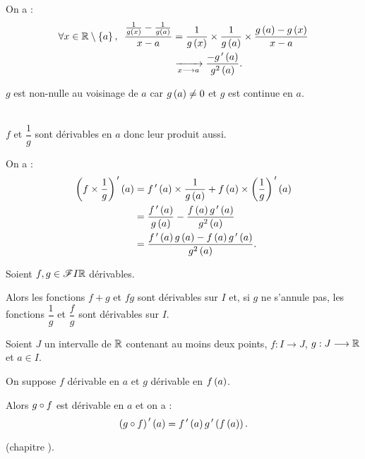 \begin{dem}[4]
On a : \[\begin{aligned}
\quantifs{\forall x\in\R\excluant\accol{a}}\dfrac{\frac{1}{g\paren{x}}-\frac{1}{g\paren{a}}}{x-a}&=\dfrac{1}{g\paren{x}}\times\dfrac{1}{g\paren{a}}\times\dfrac{g\paren{a}-g\paren{x}}{x-a} \\
&\tendqd{x\to a}\dfrac{-g\prim\paren{a}}{g^2\paren{a}}.
\end{aligned}\]

\(g\) est non-nulle au voisinage de \(a\) car \(g\left(a\right)\not=0\) et \(g\) est continue en \(a\).
\end{dem}

\begin{dem}[5]~\\
\(f\) et \(\dfrac{1}{g}\) sont dérivables en \(a\) donc leur produit aussi.

On a : \[\begin{aligned}
\left(f\times\dfrac{1}{g}\right)^{\,\prime}\left(a\right)&=f^{\,\prime}\left(a\right)\times\dfrac{1}{g\left(a\right)}+f\left(a\right)\times\left(\dfrac{1}{g}\right)^{\,\prime}\left(a\right) \\
&=\dfrac{f^{\,\prime}\left(a\right)}{g\left(a\right)}-\dfrac{f\left(a\right)g^{\,\prime}\left(a\right)}{g^2\left(a\right)} \\
&=\dfrac{f^{\,\prime}\left(a\right)g\left(a\right)-f\left(a\right)g^{\,\prime}\left(a\right)}{g^2\left(a\right)}.
\end{aligned}\]
\end{dem}

\begin{cor}
Soient \(f,g\in\mathscr{F}{I}{\mathbb{R}}\) dérivables.

Alors les fonctions \(f+g\) et \(fg\) sont dérivables sur \(I\) et, si \(g\) ne s'annule pas, les fonctions \(\dfrac{1}{g}\) et \(\dfrac{f}{g}\) sont dérivables sur \(I\).
\end{cor}

\begin{prop}
Soient \(J\) un intervalle de \(\mathbb{R}\) contenant au moins deux points, \(f:I\to J\), \(g:J\longrightarrow\mathbb{R}\) et \(a\in I\).

On suppose \(f\) dérivable en \(a\) et \(g\) dérivable en \(f\left(a\right)\).

Alors \(g\circ f\) est dérivable en \(a\) et on a : \[\left(g\circ f\right)^{\,\prime}\left(a\right)=f^{\,\prime}\left(a\right)g^{\,\prime}\left(f\left(a\right)\right).\]
\end{prop}

\begin{dem}
 (\cf chapitre ).
\end{dem}

